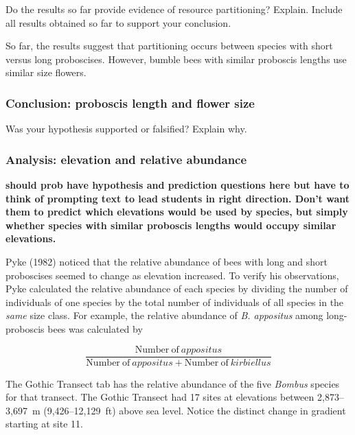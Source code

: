 \documentclass[12pt, hidelinks]{exam}
\newcommand*\AnswerBox[2]{%
    \parbox[t][#1]{0.92\textwidth}{%
    \begin{solution}#2\end{solution}}
    \vspace{\stretch{1}}
}
\begin{document}
\begin{questions}
\question[Checkout]
Do the results so far provide evidence of resource partitioning?  Explain. Include all results obtained so far to support your conclusion.

\AnswerBox{2\baselineskip}{So far, the results suggest that partitioning
occurs between species with short versus long proboscises. However, bumble
bees with similar proboscis lengths use similar size flowers.}

\subsubsection*{Conclusion: proboscis length and flower size}

\question[Checkout]
Was your hypothesis supported or falsified? Explain why.

\subsubsection*{Analysis: elevation and relative abundance}

\textbf{should prob have hypothesis and prediction questions here
but have to think of prompting text to lead students in right 
direction. Don't want them to predict which elevations would be
used by species, but simply whether species with similar proboscis
lengths would occupy similar elevations.}

Pyke (1982) noticed that the relative abundance of bees with long 
and short proboscises seemed to change as elevation increased. To 
verify his observations, Pyke calculated the relative abundance
of each species by dividing the number of individuals of
one species by the total number of individuals of all species in
the \emph{same} size class. For example, the relative abundance
of \textit{B. appositus} among long-proboscis bees was calculated by

\begin{equation*}
\dfrac{\mathrm{Number~of}~appositus}{\mathrm{Number~of}~appositus + 
\mathrm{Number~of}~kirbiellus}
\end{equation*}

The Gothic Transect tab has the relative abundance of the five 
\textit{Bombus} species for that transect. The Gothic Transect 
had 17 sites at elevations between 
2,873–3,697~m (9,426–12,129~ft) above sea level. Notice the
distinct change in gradient starting at site 11.

\begin{multicols}{2}


\end{multicols}
\end{questions}
\end{document}
